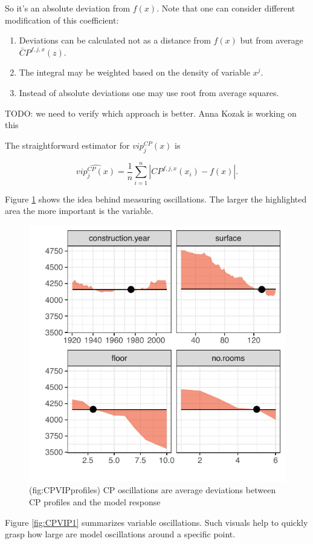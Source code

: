 \documentclass[]{krantz}
\providecommand{\tightlist}{%
  \setlength{\itemsep}{0pt}\setlength{\parskip}{0pt}}
\theoremstyle{definition}
\theoremstyle{definition}
\theoremstyle{definition}
\theoremstyle{remark}
\begin{document}
So it's an absolute deviation from \(f(x)\). Note that one can consider
different modification of this coefficient:

\begin{enumerate}
\def\labelenumi{\arabic{enumi}.}
\tightlist
\item
  Deviations can be calculated not as a distance from \(f(x)\) but from
  average \(\bar CP^{f,j,x}(z)\).
\item
  The integral may be weighted based on the density of variable \(x^j\).
\item
  Instead of absolute deviations one may use root from average squares.
\end{enumerate}

TODO: we need to verify which approach is better. Anna Kozak is working
on this

The straightforward estimator for \(vip^{CP}_j(x)\) is

\[
\widehat{ vip^{CP}_j(x)} = \frac 1n \sum_{i=1}^n |CP^{f,j,x}(x_i) - f(x)|.
\]

Figure \ref{fig:CPVIPprofiles} shows the idea behind measuring
oscillations. The larger the highlighted area the more important is the
variable.

\begin{figure}

{\centering \includegraphics[width=0.5\linewidth]{figure/CP_VIP_profiles} 

}

\caption{(fig:CPVIPprofiles) CP oscillations are average deviations between CP profiles and the model response}\label{fig:CPVIPprofiles}
\end{figure}

Figure \ref{fig:CPVIP1} summarizes variable oscillations. Such visuals
help to quickly grasp how large are model oscillations around a specific
point.
\end{document}
